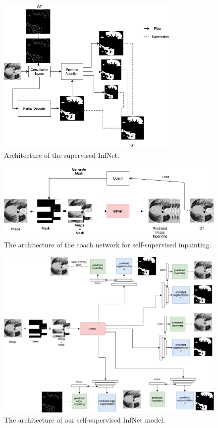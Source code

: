 \begin{figure}
	\small
	\includegraphics[width=88mm]{supervised-inf-net.png}
	\caption{Architecture of the supervised InfNet.  }
	\label{fig:supervised-inf-net_arch}
\end{figure}

\begin{figure}
	\centering
	\small
	\includegraphics[width=\linewidth]{coach.png}
	\caption{The architecture of the coach network for self-supervised inpainting. }
\end{figure}

\begin{figure}
	\centering
	\small
	\includegraphics[width=\linewidth]{self-super-inf-net.png}
	\caption{The architecture of our self-supervised InfNet model. }
	\label{fig:inf-net_arch}
\end{figure}

